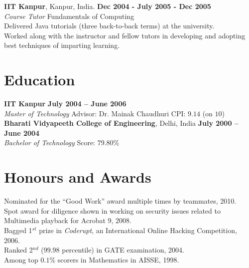 \documentclass[margin,line]{resume}
\begin{document}
\begin{resume}
	\textbf{IIT Kanpur}, Kanpur, India. \hfill \textbf{Dec 2004 - July 2005 - Dec 2005} \vspace{2mm}\\\vspace{1mm}%
	\textsl{Course Tutor} \hfill Fundamentals of Computing\\
	Delivered Java tutorials (three back-to-back terms) at the university.\\
	Worked along with the instructor and fellow tutors in developing and adopting best techniques of imparting learning.
	\section{\mysidestyle Education}

	\textbf{IIT Kanpur} \hfill \textbf{July 2004 -- June 2006}\\
	\textsl{Master of Technology} \hfill Advisor:  Dr. Mainak Chaudhuri \hfill CPI: $9.14$ (on $10$)\vspace{2mm}\\%
	\textbf{Bharati Vidyapeeth College of Engineering}, Delhi, India \hfill \textbf{July 2000 -- June 2004}\\
	\textsl{Bachelor of Technology} \hfill Score: $79.80$\%

	\section{\mysidestyle Honours and Awards} 

	Nominated for the ``Good Work'' award multiple times by teammates, 2010.  \vspace{1mm}\\%
	Spot award for diligence shown in working on security issues related to Multimedia playback for Acrobat 9, 2008.  \vspace{1mm}\\%
	Bagged 1$^{st}$ prize in \textit{Coderupt}, an International Online Hacking Competition, 2006.            \vspace{1mm}\\%
	Ranked 2$^{nd}$ ($99.98$ percentile) in GATE examination, 2004.                                           \vspace{1mm}\\%
	Among top $0.1\%$ scorers in Mathematics in AISSE, 1998.


\end{resume}
\end{document}
